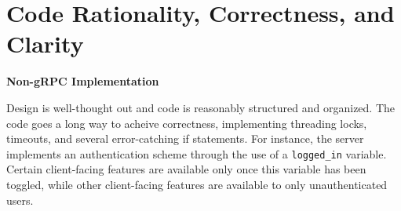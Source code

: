 \documentclass[9pt,twocolumn,twoside]{osajnl}
\begin{document}








\section{Code Rationality, Correctness, and Clarity}
\label{sec:examples}
\noindent \textbf{Non-gRPC Implementation}

\smallskip

\noindent Design is well-thought out and code is reasonably structured and organized. The code goes a long way to acheive correctness, implementing threading locks, timeouts, and several error-catching if statements. For instance, the server implements an authentication scheme through the use of a \texttt{logged\_in} variable. Certain client-facing features are available only once this variable has been toggled, while other client-facing features are available to only unauthenticated users.
\end{document}

